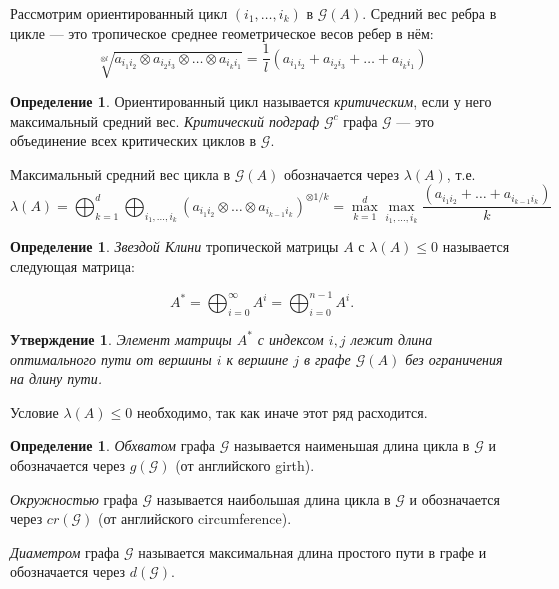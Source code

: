 \documentclass[12pt]{article}
\newtheorem{proposition}[theorem]{Утверждение}
\theoremstyle{definition}
\newtheorem{definition}[theorem]{Определение}
\begin{document}
Рассмотрим ориентированный цикл $(i_1, \dots, i_k)$ в $\mathcal{G}(A)$. Средний вес ребра в цикле --- это тропическое среднее геометрическое весов ребер в нём:
\begin{equation*}
    \sqrt[\otimes l]{a_{i_1 i_2} \otimes a_{i_2 i_3} \otimes \dots \otimes a_{i_k i_1}}=
    \frac{1}{l}(a_{i_1 i_2} + a_{i_2 i_3} + \dots + a_{i_k i_1})
\end{equation*}

\begin{definition}
Ориентированный цикл называется \textit{критическим}, если у него максимальный средний вес. \textit{Критический подграф} $\mathcal{G}^c$ графа $\mathcal{G}$ --- это объединение всех критических циклов в $\mathcal{G}$.

Максимальный средний вес цикла в $\mathcal{G}(A)$ обозначается через $\lambda(A)$, т.е.
\begin{equation*}
        \lambda(A) = \bigoplus_{k = 1}^d \bigoplus_{i_1, \dots, i_k} (a_{{i_1}{i_2}}\otimes \dots \otimes a_{{i_{k - 1}}{i_k}})^{\otimes{1/k}} = \max_{k = 1}^d \max_{i_1, \dots, i_k} \frac{(a_{{i_1}{i_2}} + \dots + a_{{i_{k - 1}}{i_k}})}{k}
\end{equation*}
\end{definition}

\begin{definition}
\textit{Звездой Клини} тропической матрицы $A$ с $\lambda(A) \le 0$ называется следующая матрица:

\begin{equation*}
    A^* = \bigoplus_{i = 0}^{\infty} A^i =  \bigoplus_{i = 0}^{n - 1} A^i.
\end{equation*}
\end{definition}

\begin{proposition}\cite[равенство (8)]{15WeakCSRExpantion}
Элемент матрицы $A^*$ с индексом $i, j$ лежит длина оптимального пути от вершины $i$ к вершине $j$ в графе $\mathcal{G}(A)$ без ограничения на длину пути.
\end{proposition}

Условие $\lambda(A) \le 0$ необходимо, так как иначе этот ряд расходится.

\begin{definition}
\textit{Обхватом} графа $\mathcal{G}$ называется наименьшая длина цикла в $\mathcal{G}$ и обозначается через $g(\mathcal{G})$ (от английского girth).

\textit{Окружностью} графа $\mathcal{G}$ называется наибольшая длина цикла в $\mathcal{G}$ и обозначается через $cr(\mathcal{G})$ (от английского circumference).

\textit{Диаметром} графа $\mathcal{G}$ называется максимальная длина простого пути в графе и обозначается через $d(\mathcal{G})$.
\end{definition}
\end{document}
